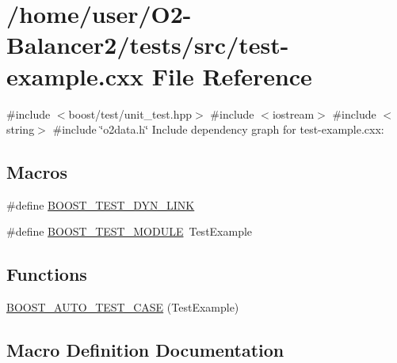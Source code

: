\hypertarget{test-example_8cxx}{}\section{/home/user/\+O2-\/\+Balancer2/tests/src/test-\/example.cxx File Reference}
\label{test-example_8cxx}
{\ttfamily \#include $<$boost/test/unit\+\_\+test.\+hpp$>$}\newline
{\ttfamily \#include $<$iostream$>$}\newline
{\ttfamily \#include $<$string$>$}\newline
{\ttfamily \#include \char`\"{}o2data.\+h\char`\"{}}\newline
Include dependency graph for test-\/example.cxx\+:
\subsection*{Macros}
\begin{DoxyCompactItemize}
\item 
\#define \hyperlink{test-example_8cxx_a139f00d2466d591f60b8d6a73c8273f1}{B\+O\+O\+S\+T\+\_\+\+T\+E\+S\+T\+\_\+\+D\+Y\+N\+\_\+\+L\+I\+NK}
\item 
\#define \hyperlink{test-example_8cxx_a6b2a3852db8bb19ab6909bac01859985}{B\+O\+O\+S\+T\+\_\+\+T\+E\+S\+T\+\_\+\+M\+O\+D\+U\+LE}~Test\+Example
\end{DoxyCompactItemize}
\subsection*{Functions}
\begin{DoxyCompactItemize}
\item 
\hyperlink{test-example_8cxx_a87d7337f29ad0e2d4dccb0b53c8a9ea1}{B\+O\+O\+S\+T\+\_\+\+A\+U\+T\+O\+\_\+\+T\+E\+S\+T\+\_\+\+C\+A\+SE} (Test\+Example)
\end{DoxyCompactItemize}


\subsection{Macro Definition Documentation}
\mbox{\label{test-example_8cxx_a139f00d2466d591f60b8d6a73c8273f1}} 
